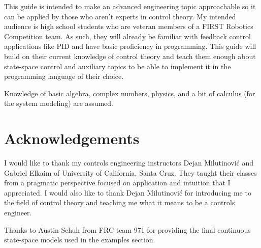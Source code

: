 This guide is intended to make an advanced engineering topic approachable so it
can be applied by those who aren't experts in control theory. My intended
audience is high school students who are veteran members of a FIRST Robotics
Competition team. As such, they will already be familiar with feedback control
applications like PID and have basic proficiency in programming. This guide will
build on their current knowledge of control theory and teach them enough about
state-space control and auxiliary topics to be able to implement it in the
programming language of their choice.

Knowledge of basic algebra, complex numbers, physics, and a bit of calculus (for
the system modeling) are assumed.

\section*{Acknowledgements}

I would like to thank my controls engineering instructors Dejan Milutinovi\'c
and Gabriel Elkaim of University of California, Santa Cruz. They taught their
classes from a pragmatic perspective focused on application and intuition that I
appreciated. I would also like to thank Dejan Milutinovi\'c for introducing me
to the field of control theory and teaching me what it means to be a controls
engineer.

Thanks to Austin Schuh from FRC team 971 for providing the final continuous
state-space models used in the examples section.

\cleardoublepage
